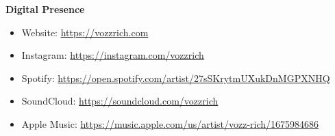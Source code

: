 \documentclass{article}
\begin{document}
\textbf{Digital Presence}
\begin{itemize}
\item Website: \url{https://vozzrich.com}
\item Instagram: \url{https://instagram.com/vozzrich}
\item Spotify: \url{https://open.spotify.com/artist/27sSKrytmUXukDnMGPXNHQ}
\item SoundCloud: \url{https://soundcloud.com/vozzrich}
\item Apple Music: \url{https://music.apple.com/us/artist/vozz-rich/1675984686}
\end{itemize}
\end{document}

